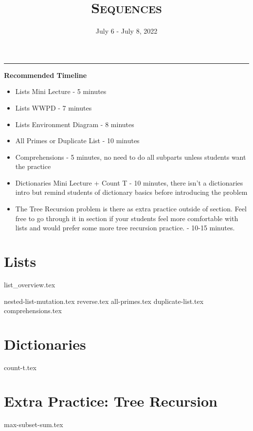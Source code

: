 \documentclass{exam}
\title{\textsc{Sequences}}
\date{July 6 - July 8, 2022}
\begin{document}
\maketitle
\rule{\textwidth}{0.15em}
\fontsize{12}{15}\selectfont


\begin{guide}
    \textbf{Recommended Timeline}
    \begin{itemize}
        \item Lists Mini Lecture - 5 minutes
        \item Lists WWPD - 7 minutes
        \item Lists Environment Diagram - 8 minutes
        \item All Primes or Duplicate List - 10 minutes
        \item Comprehensions - 5 minutes, no need to do all subparts unless students want the practice
        \item Dictionaries Mini Lecture + Count T - 10 minutes, there isn't a dictionaries intro but 
        remind students of dictionary basics before introducing the problem
        \item The Tree Recursion problem is there as extra practice outside of section. Feel free to go through it in section if your students feel more comfortable with lists
        and would prefer some more tree recursion practice. - 10-15 minutes.
    \end{itemize}
\end{guide}

\section{Lists}
{list_overview.tex}
\begin{questions}
    {nested-list-mutation.tex}
    {reverse.tex}
    \newpage %
    {all-primes.tex}
    {duplicate-list.tex}
    {comprehensions.tex}
\end{questions}

\newpage

\section{Dictionaries}
\begin{questions}
    {count-t.tex}
\end{questions}

\newpage

\section{Extra Practice: Tree Recursion}
\begin{questions}
    {max-subset-sum.tex}
\end{questions}
\end{document}
